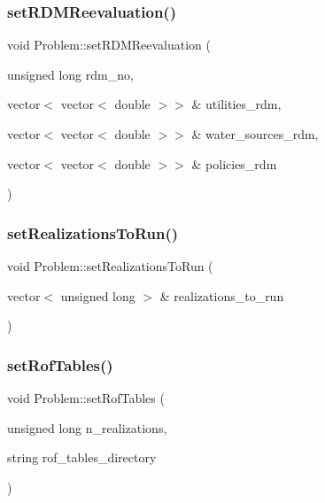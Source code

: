 \subsubsection{\texorpdfstring{set\+R\+D\+M\+Reevaluation()}{setRDMReevaluation()}}
{\footnotesize\ttfamily void Problem\+::set\+R\+D\+M\+Reevaluation (\begin{DoxyParamCaption}\item[{unsigned long}]{rdm\+\_\+no,  }\item[{vector$<$ vector$<$ double $>$$>$ \&}]{utilities\+\_\+rdm,  }\item[{vector$<$ vector$<$ double $>$$>$ \&}]{water\+\_\+sources\+\_\+rdm,  }\item[{vector$<$ vector$<$ double $>$$>$ \&}]{policies\+\_\+rdm }\end{DoxyParamCaption})}

\mbox{\label{classProblem_afe5ddeb70b303e4971251e92a10f4828}} 
\subsubsection{\texorpdfstring{set\+Realizations\+To\+Run()}{setRealizationsToRun()}}
{\footnotesize\ttfamily void Problem\+::set\+Realizations\+To\+Run (\begin{DoxyParamCaption}\item[{vector$<$ unsigned long $>$ \&}]{realizations\+\_\+to\+\_\+run }\end{DoxyParamCaption})}

\mbox{\label{classProblem_aa9debdf28260fd9054f7d6d2ee516f94}} 
\subsubsection{\texorpdfstring{set\+Rof\+Tables()}{setRofTables()}}
{\footnotesize\ttfamily void Problem\+::set\+Rof\+Tables (\begin{DoxyParamCaption}\item[{unsigned long}]{n\+\_\+realizations,  }\item[{string}]{rof\+\_\+tables\+\_\+directory }\end{DoxyParamCaption})}

